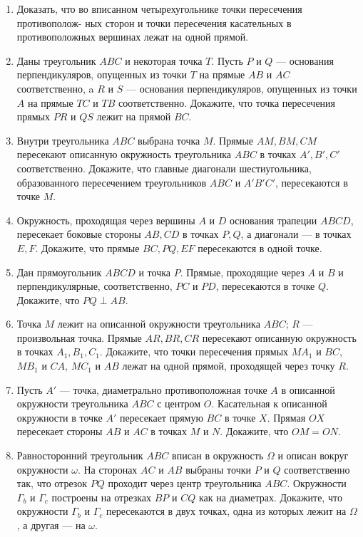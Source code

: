 \documentclass{article}
\begin{document}
	\begin{enumerate}[label*=\protect\fbox{\arabic{enumi}}]
		
		\item Доказать, что во вписанном четырехугольнике точки пересечения противополож- ных сторон и точки пересечения касательных в противоположных вершинах лежат на одной прямой.
		
		\item Даны треугольник $ABC$ и некоторая точка $T$. Пусть $P$ и $Q$ — основания перпендикуляров, опущенных из точки $T$ на прямые $AB$ и $AC$ соответственно, a $R$ и $S$ — основания перпендикуляров, опущенных из точки $A$ на прямые $TC$ и $TB$ соответственно. Докажите, что точка пересечения прямых $PR$ и $QS$ лежит на прямой $BC$.
		
		\item Внутри треугольника $ABC$ выбрана точка $M$. Прямые $AM, BM, CM$ пересекают описанную окружность треугольника $ABC$ в точках $A', B', C'$ соответственно. Докажите, что главные диагонали шестиугольника, образованного пересечением треугольников $ABC$ и $A'B'C'$, пересекаются в точке $M$.
		
		\item Окружность, проходящая через вершины $A$ и $D$ основания трапеции $ABCD$, пересекает боковые стороны $AB, CD$ в точках $P, Q$, а диагонали — в точках $E, F$. Докажите, что прямые $BC, PQ, EF$ пересекаются в одной точке.
		
		\item Дан прямоугольник $ABCD$ и точка $P$. Прямые, проходящие через $A$ и $B$ и перпендикулярные, соответственно, $PC$ и $PD$, пересекаются в точке $Q$. Докажите, что $PQ \perp AB$.
		
		\item Точка $M$ лежит на описанной окружности треугольника $ABC$; $R$ — произвольная точка. Прямые $AR, BR, CR$ пересекают описанную окружность в точках $A_1, B_1, C_1$. Докажите, что точки пересечения прямых $MA_1$ и $BC$, $MB_1$ и $CA$, $MC_1$ и $AB$ лежат на одной прямой, проходящей через точку $R$.
		
		\item Пусть $A'$ — точка, диаметрально противоположная точке $A$ в описанной окружности треугольника $ABC$ с центром $O$. Касательная к описанной окружности в точке $A'$ пересекает прямую $BC$ в точке $X$. Прямая $OX$ пересекает стороны $AB$ и $AC$ в точках $M$ и $N$. Докажите, что $OM = ON$.
		
		\item Равносторонний треугольник $ABC$ вписан в окружность $\Omega$ и описан вокруг окружности $\omega$. На сторонах $AC$ и $AB$ выбраны точки $P$ и $Q$ соответственно так, что отрезок $PQ$ проходит через центр треугольника $ABC$. Окружности $\Gamma_b$ и $\Gamma_c$ построены на отрезках $BP$ и $CQ$ как на диаметрах. Докажите, что окружности $\Gamma_b$ и $\Gamma_c$ пересекаются в двух точках, одна из которых лежит на $\Omega$, а другая --- на $\omega$.
		

\end{enumerate}
\end{document}
